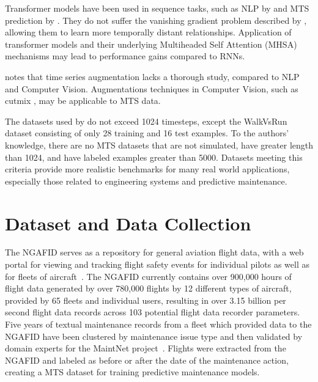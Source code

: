 \documentclass[letterpaper]{article} %
\begin{document}
Transformer models have been used in sequence tasks, such as NLP by \cite{devlin2018bert} and MTS prediction by \cite{zhou2021informer}. They do not suffer the vanishing gradient problem described by \cite{le2016quantifying}, allowing them to learn more temporally distant relationships. Application of transformer models and their underlying Multiheaded Self Attention (MHSA) mechanisms may lead to performance gains compared to RNNs.

\cite{fawaz2019deep} notes that time series augmentation lacks a thorough study, compared to NLP and Computer Vision. Augmentations techniques in Computer Vision, such as cutmix \cite{yun2019cutmix}, may be applicable to MTS data.

The datasets used by \cite{fawaz2019deep} do not exceed 1024 timesteps, except the WalkVsRun dataset consisting of only 28 training and 16 test examples. To the authors' knowledge, there are no MTS datasets that are not simulated, have greater length than 1024, and have labeled examples greater than 5000. Datasets meeting this criteria provide more realistic benchmarks for many real world applications, especially those related to engineering systems and predictive maintenance.




\section{Dataset and Data Collection}

The NGAFID serves as a repository for general aviation flight data, with a web portal for viewing and tracking flight safety events for individual pilots as well as for fleets of aircraft~\cite{karboviak2018classifying}. The NGAFID currently contains over 900,000 hours of flight data generated by over 780,000 flights by 12 different types of aircraft, provided by 65 fleets and individual users, resulting in over 3.15 billion per second flight data records across 103 potential flight data recorder parameters. Five years of textual maintenance records from a fleet which provided data to the NGAFID have been clustered by maintenance issue type and then validated by domain experts for the MaintNet project~\cite{akhbardeh-etal-2020-maintnet}. Flights were extracted from the NGAFID and labeled as before or after the date of the maintenance action, creating a MTS dataset for training predictive maintenance models.
\end{document}

